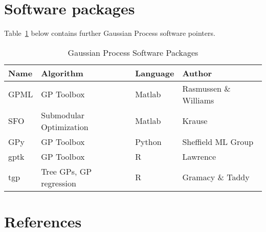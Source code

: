 \documentclass[authoryear,11pt,review]{elsarticle}
\begin{document}
\section{Software packages}
Table~\ref{software} below contains further Gaussian Process software pointers.
\FloatBarrier
\begin{table}[h!]
\caption{Gaussian Process Software Packages}
\label{software}
\centering
{\footnotesize
 \begin{tabular}{llll}
\bf{Name} & \bf{Algorithm} & \bf{Language} & \bf{Author}\\
\hline
GPML &GP Toolbox & Matlab & Rasmussen \& Williams\\
SFO  & Submodular Optimization & Matlab & Krause\\
GPy  & GP Toolbox & Python & Sheffield ML Group \\
gptk & GP Toolbox & R & Lawrence \\
tgp & Tree GPs, GP regression& R & Gramacy \& Taddy
\end{tabular}
}
\end{table}


\section*{References}


\end{document}
